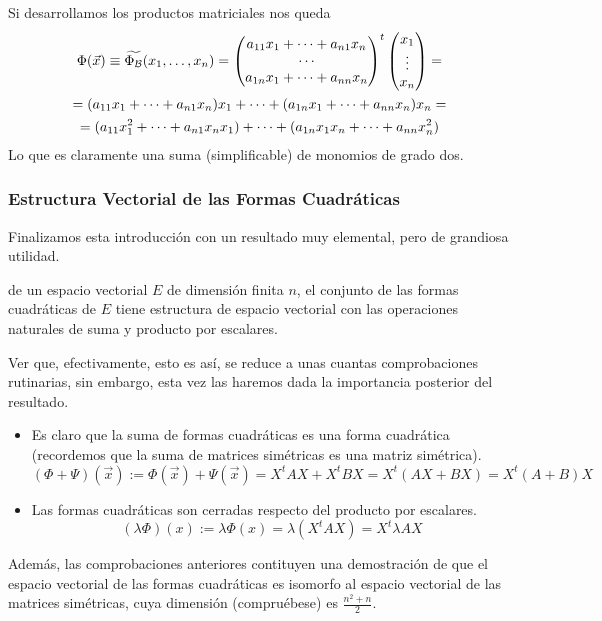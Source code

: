 Si desarrollamos los productos matriciales nos queda
\begin{multline}\Phi(\vec{x})\equiv\widetilde{\Phi_{\mathcal{B}}}(x_1,\dots,x_n)=\begin{pmatrix}
a_{11}x_1 + \cdots + a_{n1}x_n\\
\cdots\\
a_{1n}x_1 + \cdots + a_{nn}x_n
\end{pmatrix}^t\begin{pmatrix}
x_1\\
\vdots\\
x_n
\end{pmatrix}=\\=(a_{11}x_1 + \cdots + a_{n1}x_n)x_1+\dots+(a_{1n}x_1 + \cdots + a_{nn}x_n)x_n=\\=(a_{11}x_1^2 + \cdots + a_{n1}x_nx_1)+\dots +(a_{1n}x_1x_n + \cdots + a_{nn}x_n^2)\end{multline}
Lo que es claramente una suma (simplificable) de monomios de grado dos.
\subsubsection{Estructura Vectorial de las Formas Cuadráticas}
Finalizamos esta introducción con un resultado muy elemental, pero de grandiosa utilidad.

 de un espacio vectorial $E$ de dimensión finita $n$, el conjunto de las formas cuadráticas de $E$ tiene estructura de espacio vectorial con las operaciones naturales de suma y producto por escalares.

Ver que, efectivamente, esto es así, se reduce a unas cuantas comprobaciones rutinarias, sin embargo, esta vez las haremos dada la importancia posterior del resultado.

\begin{itemize}
	\item Es claro que la suma de formas cuadráticas es una forma cuadrática (recordemos que la suma de matrices simétricas es una matriz simétrica).
	\[(\Phi+\Psi)(\vec{x}):=\Phi(\vec{x})+\Psi(\vec{x})=X^tAX+X^tBX=X^t(AX+BX)=X^t(A+B)X\]
	\item Las formas cuadráticas son cerradas respecto del producto por escalares.
	\[(\lambda\Phi)(x):=\lambda\Phi(x)=\lambda(X^tAX)=X^t\lambda AX\]
\end{itemize}
Además, las comprobaciones anteriores contituyen una demostración de que el espacio vectorial de las formas cuadráticas es isomorfo al espacio vectorial de las matrices simétricas, cuya dimensión (compruébese) es $\frac{n^2+n}{2}$.

